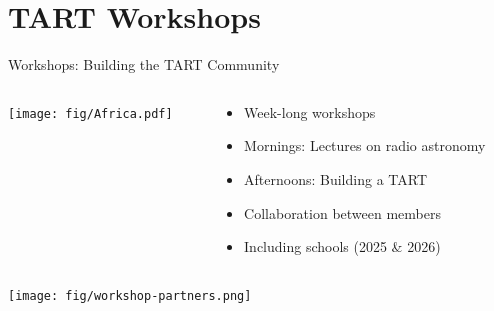 \documentclass[ignorenonframetext]{beamer}
\begin{document}
\section{TART Workshops}

\frame{\tableofcontents[currentsection]}

\begin{frame}{Workshops: Building the TART Community}
 \begin{columns}
  \begin{column}{0.4\linewidth}
\texttt{[image: fig/Africa.pdf]}
  \end{column}
  \begin{column}{0.6\linewidth}
  \begin{itemize}
   \item Week-long workshops
   \item Mornings: Lectures on radio astronomy
   \item Afternoons: Building a TART
   \item Collaboration between members
   \item Including schools (2025 \& 2026)
  \end{itemize}
\end{column}
 \end{columns} 
 \centering
   \texttt{[image: fig/workshop-partners.png]}
\end{frame}
\end{document}
